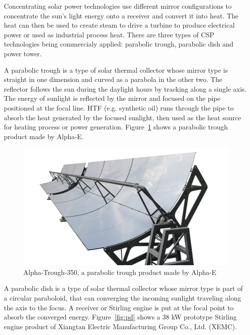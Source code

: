 Concentrating solar power technologies use different mirror configurations to concentrate the sun's light energy onto a receiver and convert it into heat. The heat can then be used to create steam to drive a turbine to produce electrical power or used as industrial process heat.
There are three types of CSP technologies being commercialy applied: parabolic trough, parabolic dish and power tower.

A parabolic trough is a type of solar thermal collector whose mirror type is straight in one dimension and curved as a parabola in the other two. The reflector follows the sun during the daylight hours by tracking along a single axis. The energy of sunlight is reflected by the mirror and focused on the pipe positioned at the focal line. HTF (e.g. synthetic oil) runs through the pipe to absorb the heat generated by the focused sunlight, then used as the heat source for heating process or power generation. Figure~\ref{fig:pt} shows a parabolic trough product made by Alpha-E.

\begin{figure}[!ht]
\centering
\includegraphics[width=.8\textwidth]{fig/ParabolicTrough}
\caption{Alpha-Trough-350, a parabolic trough product made by Alpha-E}\label{fig:pt}
\end{figure}

A parabolic dish is a type of solar thermal collector whose mirror type is part of a circular paraboloid, that can converging the incoming sunlight traveling along the axis to the focus. A receiver or Stirling engine is put at the focal point to absorb the converged energy. Figure~\ref{fig:pd} shows a 38 kW prototype Stirling engine product of Xiangtan Electric Manufacturing Group Co., Ltd. (XEMC).

